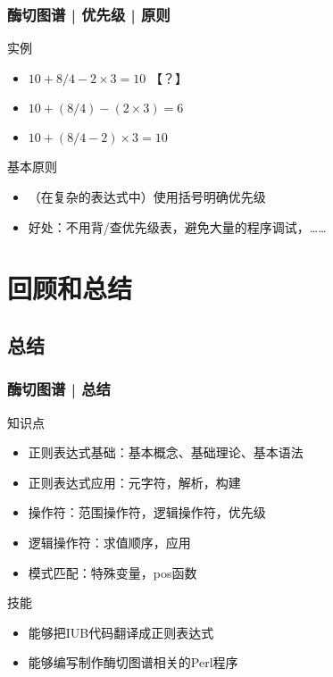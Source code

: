\begin{frame}
  \frametitle{酶切图谱 | 优先级 | 原则}
  \begin{block}{实例}
    \begin{itemize}
      \item $10 + 8 / 4 - 2 \times 3 = 10$ \alert{【？】}
      \item $10 + (8 / 4) - (2 \times 3) = 6$
      \item $10 + (8 / 4 - 2) \times 3 = 10$
    \end{itemize}
  \end{block}
  \pause
  \begin{block}{\alert{基本原则}}
    \begin{itemize}
      \item （在复杂的表达式中）使用括号明确优先级
      \item 好处：不用背/查优先级表，避免大量的程序调试，……
    \end{itemize}
  \end{block}
\end{frame}

\section{回顾和总结}
\subsection{总结}
\begin{frame}
  \frametitle{酶切图谱 | 总结}
  \begin{block}{知识点}
    \begin{itemize}
      \item 正则表达式基础：基本概念、基础理论、基本语法
      \item 正则表达式应用：元字符，解析，构建
      \item 操作符：范围操作符，逻辑操作符，优先级
      \item 逻辑操作符：求值顺序，应用
      \item 模式匹配：特殊变量，pos函数
    \end{itemize}
  \end{block}
  \pause
  \begin{block}{技能}
    \begin{itemize}
      \item 能够把IUB代码翻译成正则表达式
      \item 能够编写制作酶切图谱相关的Perl程序
    \end{itemize}
  \end{block}
\end{frame}

